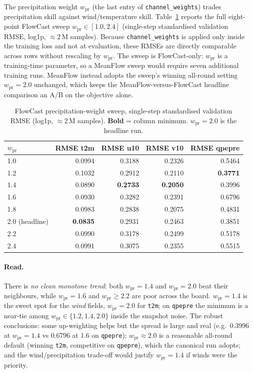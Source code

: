 The precipitation weight $w_{\text{pr}}$ (the last entry of \texttt{channel\_weights}) trades precipitation skill against wind/temperature skill. Table~\ref{tab:qpw} reports the full eight-point FlowCast sweep $w_{\text{pr}} \in [1.0, 2.4]$ (single-step standardised validation RMSE, log1p, $\approx 2\,\text{M}$ samples). Because \texttt{channel\_weights} is applied only inside the training loss and not at evaluation, these RMSEs are directly comparable across rows without rescaling by $w_{\text{pr}}$. The sweep is FlowCast-only: $w_{\text{pr}}$ is a training-time parameter, so a MeanFlow sweep would require seven additional training runs. MeanFlow instead adopts the sweep's winning all-round setting $w_{\text{pr}} = 2.0$ unchanged, which keeps the MeanFlow-versus-FlowCast headline comparison an A/B on the objective alone.

\begin{table}[htbp]
  \centering
  \caption[Precipitation channel-weight ablation]{FlowCast precipitation-weight sweep, single-step standardised validation RMSE (log1p, $\approx 2\,\text{M}$ samples). \textbf{Bold} = column minimum. $w_{\text{pr}} = 2.0$ is the headline run.}
  \label{tab:qpw}
  \small
  \begin{tabular}{lrrrr}
    \toprule
    $w_{\text{pr}}$ & RMSE t2m & RMSE u10 & RMSE v10 & RMSE qpepre \\
    \midrule
    1.0 & 0.0994 & 0.3188 & 0.2326 & 0.5464 \\
    1.2 & 0.1032 & 0.2912 & 0.2110 & \textbf{0.3771} \\
    1.4 & 0.0890 & \textbf{0.2733} & \textbf{0.2050} & 0.3996 \\
    1.6 & 0.0930 & 0.3282 & 0.2391 & 0.6796 \\
    1.8 & 0.0983 & 0.2838 & 0.2075 & 0.4831 \\
    2.0 (headline) & \textbf{0.0835} & 0.2931 & 0.2463 & 0.3851 \\
    2.2 & 0.0990 & 0.3178 & 0.2499 & 0.5178 \\
    2.4 & 0.0991 & 0.3075 & 0.2355 & 0.5515 \\
    \bottomrule
  \end{tabular}
\end{table}

\paragraph{Read.} There is \emph{no clean monotone trend}: both $w_{\text{pr}} = 1.4$ and $w_{\text{pr}} = 2.0$ beat their neighbours, while $w_{\text{pr}} = 1.6$ and $w_{\text{pr}} \geq 2.2$ are poor across the board. $w_{\text{pr}} = 1.4$ is the sweet spot for the \emph{wind} fields, $w_{\text{pr}} = 2.0$ for \texttt{t2m}; on \texttt{qpepre} the minimum is a near-tie among $w_{\text{pr}} \in \{1.2, 1.4, 2.0\}$ inside the snapshot noise. The robust conclusions: some up-weighting helps but the spread is large and real (e.g.\ \num{0.3996} at $w_{\text{pr}}=1.4$ vs \num{0.6796} at $1.6$ on \texttt{qpepre}); $w_{\text{pr}} \approx 2.0$ is a reasonable all-round default (winning \texttt{t2m}, competitive on \texttt{qpepre}), which the canonical run adopts; and the wind/precipitation trade-off would justify $w_{\text{pr}} = 1.4$ if winds were the priority.

